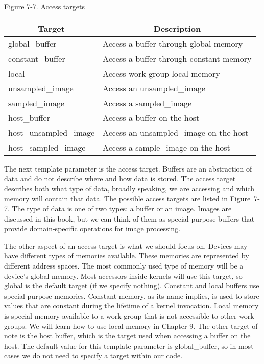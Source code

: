 \hspace*{\fill} \par %
Figure 7-7. Access targets
\begin{table}[H]
	\begin{tabular}{|l|l|}
		\hline
		\multicolumn{1}{|c|}{Target} & \multicolumn{1}{c|}{Description}        \\ \hline
		global\_buffer               & Access a buffer through global memory   \\ \hline
		constant\_buffer             & Access a buffer through constant memory \\ \hline
		local                        & Access work-group local memory          \\ \hline
		unsampled\_image             & Access an unsampled\_image              \\ \hline
		sampled\_image               & Access a sampled\_image                 \\ \hline
		host\_buffer                 & Access a buffer on the host             \\ \hline
		host\_unsampled\_image       & Access an unsampled\_image on the host  \\ \hline
		host\_sampled\_image         & Access a sample\_image on the host      \\ \hline
	\end{tabular}
\end{table}

The next template parameter is the access target. Buffers are an abstraction of data and do not describe where and how data is stored. The access target describes both what type of data, broadly speaking, we are accessing and which memory will contain that data. The possible access targets are listed in Figure 7-7. The type of data is one of two types: a buffer or an image. Images are discussed in this book, but we can think of them as special-purpose buffers that provide domain-specific operations for image processing.\par

The other aspect of an access target is what we should focus on. Devices may have different types of memories available. These memories are represented by different address spaces. The most commonly used type of memory will be a device’s global memory. Most accessors inside kernels will use this target, so global is the default target (if we specify nothing). Constant and local buffers use special-purpose memories. Constant memory, as its name implies, is used to store values that are constant during the lifetime of a kernel invocation. Local memory is special memory available to a work-group that is not accessible to other work-groups. We will learn how to use local memory in Chapter 9. The other target of note is the host buffer, which is the target used when accessing a buffer on the host. The default value for this template parameter is global\_buffer, so in most cases we do not need to specify a target within our code.\par

